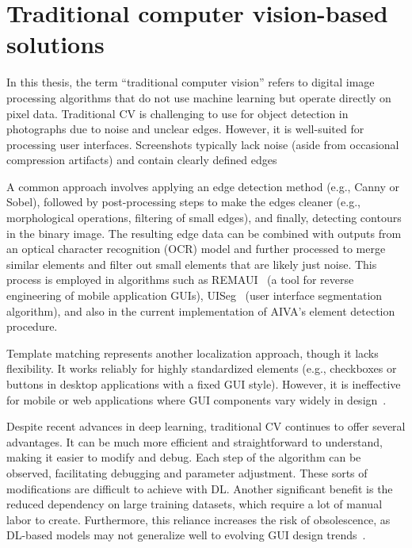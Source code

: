 \documentclass[
  digital,     %
  oneside,     %
  nosansbold,  %
  nocolorbold, %
  lof,         %
  lot,         %
]{fithesis4}
\begin{document}
\section{Traditional computer vision-based solutions}
\label{sec:traditionalCV}

In this thesis, the term \enquote{traditional computer vision} refers to digital image processing algorithms that do not use machine learning but operate directly on pixel data. Traditional CV is challenging to use for object detection in photographs due to noise and unclear edges. However, it is well-suited for processing user interfaces. Screenshots typically lack noise (aside from occasional compression artifacts) and contain clearly defined edges

A common approach involves applying an edge detection method (e.g., Canny or Sobel), followed by post-processing steps to make the edges cleaner (e.g., morphological operations, filtering of small edges), and finally, detecting contours in the binary image. The resulting edge data can be combined with outputs from an optical character recognition (OCR) model and further processed to merge similar elements and filter out small elements that are likely just noise. This process is employed in algorithms such as REMAUI~\cite{remaui} (a tool for reverse engineering of mobile application GUIs), UISeg~\cite{uiseg} (user interface segmentation algorithm), and also in the current implementation of AIVA's element detection procedure.

Template matching represents another localization approach, though it lacks flexibility. It works reliably for highly standardized elements (e.g., checkboxes or buttons in desktop applications with a fixed GUI style). However, it is ineffective for mobile or web applications where GUI components vary widely in design~\cite{ODforGUI_CV_DL_or_both}.

Despite recent advances in deep learning, traditional CV continues to offer several advantages. It can be much more efficient and straightforward to understand, making it easier to modify and debug. Each step of the algorithm can be observed, facilitating debugging and parameter adjustment. These sorts of modifications are difficult to achieve with DL. Another significant benefit is the reduced dependency on large training datasets, which require a lot of manual labor to create. Furthermore, this reliance increases the risk of obsolescence, as DL-based models may not generalize well to evolving GUI design trends~\cite{DLvsTCV}.
\end{document}
